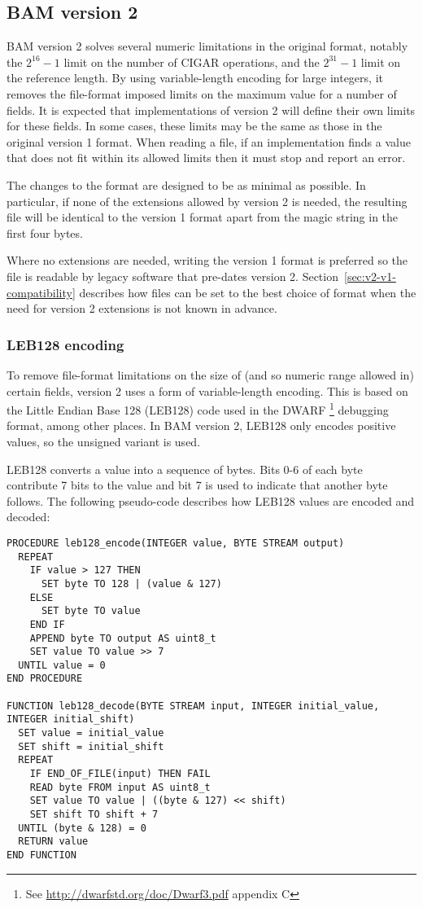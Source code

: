 \documentclass[10pt]{article}
\begin{document}
\subsection{BAM version 2}\label{sec:v2}

BAM version 2 solves several numeric limitations in the original format,
notably the $2^{16}-1$ limit on the number of CIGAR operations, and the
$2^{31}-1$ limit on the reference length.
By using variable-length encoding for large integers, it removes the
file-format imposed limits on the maximum value for a number of fields.
It is expected that implementations of version 2 will define their own limits
for these fields.
In some cases, these limits may be the same as those in the original version 1
format.
When reading a file, if an implementation finds a value that does not fit
within its allowed limits then it must stop and report an error.

The changes to the format are designed to be as minimal as possible.
In particular, if none of the extensions allowed by version 2 is needed, the
resulting file will be identical to the version 1 format apart from the
{\sf magic} string in the first four bytes.

Where no extensions are needed, writing the version 1 format is preferred
so the file is readable by legacy software that pre-dates version 2.
Section~\ref{sec:v2-v1-compatibility} describes how files can be set to
the best choice of format when the need for version 2 extensions is
not known in advance.

\subsubsection{LEB128 encoding}

To remove file-format limitations on the size of (and so numeric
range allowed in) certain fields, version 2 uses a form of variable-length
encoding.
This is based on the Little Endian Base 128 (LEB128) code used in the DWARF
\footnote{See \url{http://dwarfstd.org/doc/Dwarf3.pdf} appendix C} debugging
format, among other places.
In BAM version 2, LEB128 only encodes positive values, so the unsigned
variant is used.

LEB128 converts a value into a sequence of bytes.
Bits 0-6 of each byte contribute 7 bits to the value and bit 7 is used to
indicate that another byte follows.
The following pseudo-code describes how LEB128 values are encoded and decoded:

\begin{verbatim}
PROCEDURE leb128_encode(INTEGER value, BYTE STREAM output)
  REPEAT
    IF value > 127 THEN
      SET byte TO 128 | (value & 127)
    ELSE
      SET byte TO value
    END IF
    APPEND byte TO output AS uint8_t
    SET value TO value >> 7
  UNTIL value = 0
END PROCEDURE

FUNCTION leb128_decode(BYTE STREAM input, INTEGER initial_value, INTEGER initial_shift)
  SET value = initial_value
  SET shift = initial_shift
  REPEAT
    IF END_OF_FILE(input) THEN FAIL
    READ byte FROM input AS uint8_t
    SET value TO value | ((byte & 127) << shift)
    SET shift TO shift + 7
  UNTIL (byte & 128) = 0
  RETURN value
END FUNCTION
\end{verbatim}
\end{document}
